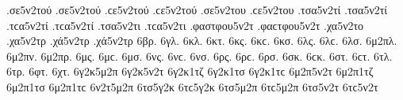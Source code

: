 {.σε5ν2τού .σε5ν2τού .ϲε5ν2τού .ϲε5ν2τού 
.σε5ν2του .ϲε5ν2του 
.τσα5ν2τί .τσα5ν2τί .τϲα5ν2τί .τϲα5ν2τί   %
.τσα5ν2τι .τϲα5ν2τι 
.φαστφου5ν2τ .φαϲτφου5ν2τ   %
.χα5ν2το   %
.χα5ν2τρ   %
.χά5ν2τρ .χά5ν2τρ 
6βρ.   %
6γλ.   %
6κλ.   %
6κτ.   %
6κς. 6κϲ.   %
6κσ. 
6λς. 6λϲ.   %
6λσ. 
6μ2πλ.   %
6μ2πν.   %
6μ2πρ.   %
6μς. 6μϲ.   %
6μσ. 
6νς. 6νϲ.   %
6νσ. 
6ρς. 6ρϲ.   %
6ρσ. 
6σκ. 6ϲκ.   %
6στ. 6ϲτ.   %
6τλ.   %
6τρ.   %
6φτ.   %
6χτ.   %
6γ2κ5μ2π 
6γ2κ5ν2τ 
6γ2κ1τζ 
6γ2κ1τσ 6γ2κ1τϲ 
6μ2π5ν2τ 
6μ2π1τζ 
6μ2π1τσ 6μ2π1τϲ 
6ν2τ5μ2π 
6τσ5γ2κ 6τϲ5γ2κ 
6τσ5μ2π 6τϲ5μ2π 
6τσ5ν2τ 6τϲ5ν2τ 
}
